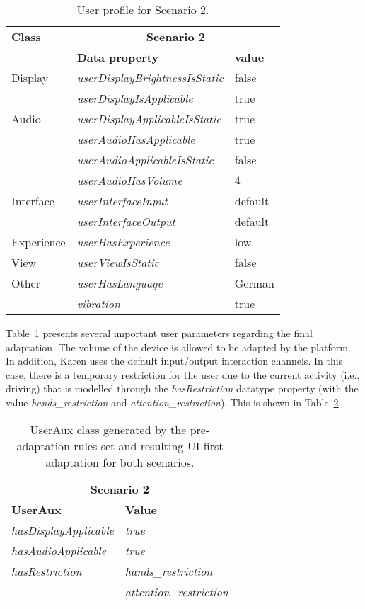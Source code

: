 \begin{table}
 \caption{User profile for Scenario 2.}
 \label{tbl:user_profile_scenario2}
 \footnotesize
 \centering
\begin{tabular}{l l l}
  \hline 
  \textbf{Class} & \multicolumn{2}{c}{\textbf{Scenario 2}}		\\
	  & \textbf{Data property} 		   & \textbf{value}	\\
  \hline
  Display & \textit{userDisplayBrightnessIsStatic} & false		\\
	  & \textit{userDisplayIsApplicable} 	   & true		\\
  Audio   & \textit{userDisplayApplicableIsStatic}& true		\\
	  & \textit{userAudioHasApplicable} 	   & true		\\
	  & \textit{userAudioApplicableIsStatic}   & false		\\
	  & \textit{userAudioHasVolume}  	   & $4$ 		\\
 Interface& \textit{userInterfaceInput}		   & default		\\
	  & \textit{userInterfaceOutput} 	   & default		\\
Experience& \textit{userHasExperience} 		   & low		\\
  View	  & \textit{userViewIsStatic}		   & false		\\
  Other   & \textit{userHasLanguage}		   & German		\\
	  & \textit{vibration} 			   & true 		\\
  \hline
\end{tabular}
\end{table}

Table~\ref{tbl:user_profile_scenario2} presents several important user 
parameters regarding the final adaptation. The volume of the device is allowed
to be adapted by the platform. In addition, Karen uses the default 
input/output interaction channels. In this case, there is a temporary 
restriction for the user due to the current activity (i.e., driving) that is 
modelled through the \textit{hasRestriction} datatype property (with the value 
\textit{hands\_restriction} and \textit{attention\_restriction}). This is shown
in Table~\ref{tbl:userAux_scenario2}.

\begin{table}
 \caption{UserAux class generated by the pre-adaptation rules set and resulting
 UI first adaptation for both scenarios.}
 \label{tbl:userAux_scenario2}
 \footnotesize
 \centering
\begin{tabular}{l l}
  \hline 
  \multicolumn{2}{c}{\textbf{Scenario 2}}			\\
  \textbf{UserAux} 		& \textbf{Value} 		\\
  \hline
  \textit{hasDisplayApplicable}	& \textit{true}			\\
  \textit{hasAudioApplicable}	& \textit{true} 		\\
  \textit{hasRestriction}	& \textit{hands\_restriction}	\\
  ~				& \textit{attention\_restriction}\\
  \hline
\end{tabular}
\end{table}

